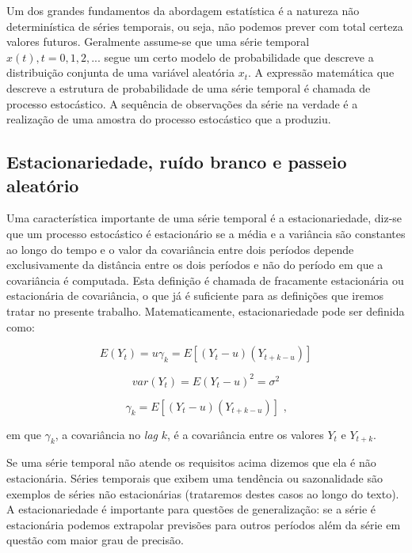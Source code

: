 \documentclass[twocolumn]{rbef}
\newcommand{\1}{\mathbbm{1}}
\begin{document}
Um dos grandes fundamentos da abordagem estatística é a natureza não determinística de séries temporais, ou seja, não podemos prever com total certeza valores futuros. Geralmente assume-se que uma série temporal ${x(t),t=0,1,2,...}$ segue um certo modelo de probabilidade que descreve a distribuição conjunta de uma variável aleatória $x_{t}$. A expressão matemática que descreve a estrutura de probabilidade de uma série temporal é chamada de processo estocástico. A sequência de observações da série na verdade é a realização de uma amostra do processo estocástico que a produziu.

\subsection{Estacionariedade, ruído branco e passeio aleatório} \label{stationary}

Uma característica importante de uma série temporal é a estacionariedade, diz-se que um processo estocástico é estacionário se a média e a variância são constantes ao longo do tempo e o valor da covariância entre dois períodos depende exclusivamente da distância entre os dois períodos e não do período em que a covariância é computada. Esta definição é chamada de fracamente estacionária ou estacionária de covariância, o que já é suficiente para as definições que iremos tratar no presente trabalho. Matematicamente, estacionariedade pode ser definida como:

\begin{equation}
E(Y_{t}) = u 
\gamma_{k} = E[(Y_{t} - u) (Y_{t+k - u})]
\end{equation}

\begin{equation}
var(Y_t) = E(Y_{t} - u)^2 = \sigma^{2} 
\end{equation}

\begin{equation}
\gamma_{k} = E[(Y_{t} - u) (Y_{t+k - u})] \text{ ,}
\end{equation}

em que $\gamma_{k}$, a covariância no \textit{lag} $k$, é a covariância entre os valores $Y_{t}$ e $Y_{t+k}$.

Se uma série temporal não atende os requisitos acima dizemos que ela é não estacionária. Séries temporais que exibem uma tendência ou sazonalidade são exemplos de séries não estacionárias (trataremos destes casos ao longo do texto). A estacionariedade é importante para questões de generalização: se a série é estacionária podemos extrapolar previsões para outros períodos além da série em questão com maior grau de precisão.
\end{document}
